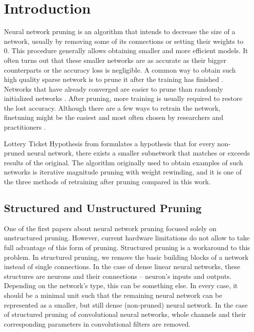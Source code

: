 \section{Introduction}

Neural network pruning is an algorithm that intends to decrease the size of a network, usually by removing some of its connections or setting their weights to 0. 
This procedure generally allows obtaining smaller and more efficient models.
It often turns out that these smaller networks are as accurate as their bigger counterparts or the accuracy loss is negligible.
A common way to obtain such high quality sparse network is to prune it after the training has finished \cite{Frankle, rethinking}.
Networks that have already converged are easier to prune than randomly initialized networks \cite{snip, rethinking}.
After pruning, more training is usually required to restore the lost accuracy.
Although there are a few ways to retrain the network, finetuning might be the easiest and most often chosen by researchers and practitioners \cite{Renda, rethinking}.

Lottery Ticket Hypothesis from \cite{Frankle} formulates a hypothesis that for every non-pruned neural network, there exists a smaller subnetwork that matches or exceeds results of the original. The algorithm originally used to obtain examples of such networks is iterative magnitude pruning with weight rewinding, and it is one of the three methods of retraining after pruning compared in this work.

\subsection{Structured and Unstructured Pruning}

One of the first papers about neural network pruning \cite{optimal} focused solely on unstructured pruning.
However, current hardware limitations do not allow to take full advantage of this form of pruning.
Structured pruning is a workaround to this problem.
In structured pruning, we remove the basic building blocks of a network instead of single connections.
In the case of dense linear neural networks, these structures are neurons and their connections -- neuron's inputs and outputs.
Depending on the network's type, this can be something else.
In every case, it should be a minimal unit such that the remaining neural network can be represented as a smaller, but still dense (non-pruned) neural network.
In the case of structured pruning of convolutional neural networks, whole channels and their corresponding parameters in convolutional filters are removed.

